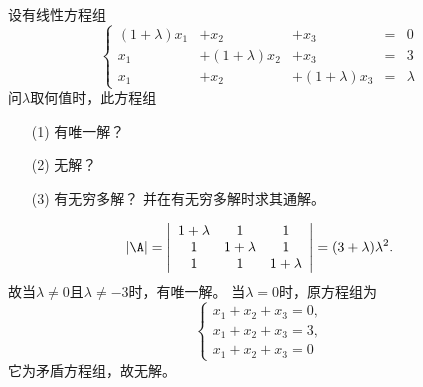 \begin{li}[重要题型]
  设有线性方程组
  $$
  \left\{
    \begin{array}{rrrcr}
      (1+\lambda)x_1&+x_2&+x_3&=&0\\[0.05in]
      x_1&+(1+\lambda)x_2&+x_3&=&3\\[0.05in]
      x_1&+x_2&+(1+\lambda)x_3&=&\lambda
    \end{array}
  \right.
  $$
  问$\lambda$取何值时，此方程组
  \begin{itemize}
  \item[(1)]有唯一解？
  \item[(2)]无解？ 
  \item[(3)]有无穷多解？ 并在有无穷多解时求其通解。
  \end{itemize}
\end{li}
\begin{jie}
  $$
  |\A|=\left|
    \begin{array}{ccc}
      1+\lambda&1&1\\
      1&1+\lambda&1\\
      1&1&1+\lambda
    \end{array}
  \right| = (3+\lambda)\lambda^2.
  $$
  故当$\lambda\ne0$且$\lambda\ne-3$时，有唯一解。
  当$\lambda=0$时，原方程组为
  $$
  \left\{
    \begin{array}{l}
      x_1+x_2+x_3=0,\\
      x_1+x_2+x_3=3,\\
      x_1+x_2+x_3=0      
    \end{array}
  \right.
  $$
  它为矛盾方程组，故无解。 \vspace{0.1in}


\end{jie}

